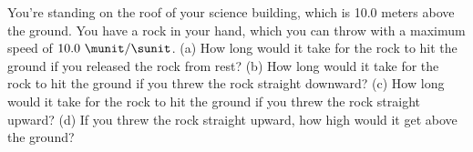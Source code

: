 You're standing on the roof of your science building, which
is 10.0 meters above the ground. You have a rock in your hand, which
you can throw with a maximum speed of $10.0\ \munit/\sunit$.
%
(a) How long would it take for the rock to hit the ground if you
released the rock from rest?\answercheck\hwendpart
%
(b) How long would it take for the rock to hit the ground if you threw
the rock straight downward?\answercheck\hwendpart
%
(c) How long would it take for the rock to hit the ground if you threw
the rock straight upward?\answercheck\hwendpart
%
(d) If you threw the rock straight upward, how high would it get
above the ground?\answercheck
